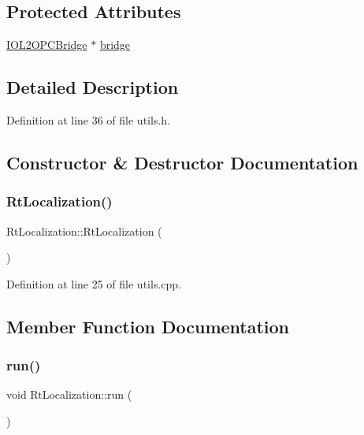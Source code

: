 \subsection*{Protected Attributes}
\begin{DoxyCompactItemize}
\item 
\hyperlink{group__iol2opc_classIOL2OPCBridge}{I\+O\+L2\+O\+P\+C\+Bridge} $\ast$ \hyperlink{classRtLocalization_a88a0e00cd0879d6faf5c28ccf7851fde}{bridge}
\end{DoxyCompactItemize}


\subsection{Detailed Description}


Definition at line 36 of file utils.\+h.



\subsection{Constructor \& Destructor Documentation}
\mbox{\label{classRtLocalization_a456a194b15ebbbf28cfae53ab09641ce}} 
\subsubsection{\texorpdfstring{Rt\+Localization()}{RtLocalization()}}
{\footnotesize\ttfamily Rt\+Localization\+::\+Rt\+Localization (\begin{DoxyParamCaption}{ }\end{DoxyParamCaption})}



Definition at line 25 of file utils.\+cpp.



\subsection{Member Function Documentation}
\mbox{\label{classRtLocalization_a8d029eee764d5e37891a1bd56ae8dc9f}} 
\subsubsection{\texorpdfstring{run()}{run()}}
{\footnotesize\ttfamily void Rt\+Localization\+::run (\begin{DoxyParamCaption}{ }\end{DoxyParamCaption})\hspace{0.3cm}{\ttfamily [protected]}}



